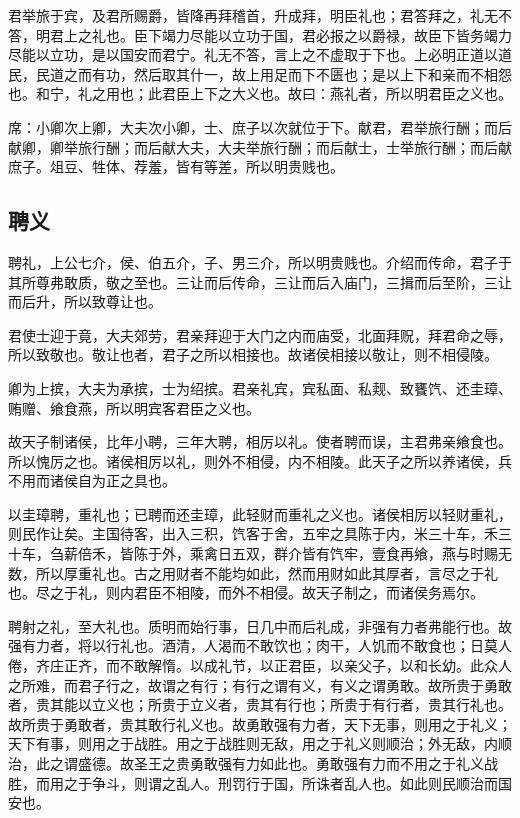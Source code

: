 \documentclass[]{article}
\begin{document}
君举旅于宾，及君所赐爵，皆降再拜稽首，升成拜，明臣礼也；君答拜之，礼无不答，明君上之礼也。臣下竭力尽能以立功于国，君必报之以爵禄，故臣下皆务竭力尽能以立功，是以国安而君宁。礼无不答，言上之不虚取于下也。上必明正道以道民，民道之而有功，然后取其什一，故上用足而下不匮也；是以上下和亲而不相怨也。和宁，礼之用也；此君臣上下之大义也。故曰：燕礼者，所以明君臣之义也。

席：小卿次上卿，大夫次小卿，士、庶子以次就位于下。献君，君举旅行酬；而后献卿，卿举旅行酬；而后献大夫，大夫举旅行酬；而后献士，士举旅行酬；而后献庶子。俎豆、牲体、荐羞，皆有等差，所以明贵贱也。

\hypertarget{header-n956}{%
\subsection{聘义}\label{header-n956}}

聘礼，上公七介，侯、伯五介，子、男三介，所以明贵贱也。介绍而传命，君子于其所尊弗敢质，敬之至也。三让而后传命，三让而后入庙门，三揖而后至阶，三让而后升，所以致尊让也。

君使士迎于竟，大夫郊劳，君亲拜迎于大门之内而庙受，北面拜贶，拜君命之辱，所以致敬也。敬让也者，君子之所以相接也。故诸侯相接以敬让，则不相侵陵。

卿为上摈，大夫为承摈，士为绍摈。君亲礼宾，宾私面、私觌、致饔饩、还圭璋、贿赠、飨食燕，所以明宾客君臣之义也。

故天子制诸侯，比年小聘，三年大聘，相厉以礼。使者聘而误，主君弗亲飨食也。所以愧厉之也。诸侯相厉以礼，则外不相侵，内不相陵。此天子之所以养诸侯，兵不用而诸侯自为正之具也。

以圭璋聘，重礼也；已聘而还圭璋，此轻财而重礼之义也。诸侯相厉以轻财重礼，则民作让矣。主国待客，出入三积，饩客于舍，五牢之具陈于内，米三十车，禾三十车，刍薪倍禾，皆陈于外，乘禽日五双，群介皆有饩牢，壹食再飨，燕与时赐无数，所以厚重礼也。古之用财者不能均如此，然而用财如此其厚者，言尽之于礼也。尽之于礼，则内君臣不相陵，而外不相侵。故天子制之，而诸侯务焉尔。

聘射之礼，至大礼也。质明而始行事，日几中而后礼成，非强有力者弗能行也。故强有力者，将以行礼也。酒清，人渴而不敢饮也；肉干，人饥而不敢食也；日莫人倦，齐庄正齐，而不敢解惰。以成礼节，以正君臣，以亲父子，以和长幼。此众人之所难，而君子行之，故谓之有行；有行之谓有义，有义之谓勇敢。故所贵于勇敢者，贵其能以立义也；所贵于立义者，贵其有行也；所贵于有行者，贵其行礼也。故所贵于勇敢者，贵其敢行礼义也。故勇敢强有力者，天下无事，则用之于礼义；天下有事，则用之于战胜。用之于战胜则无敌，用之于礼义则顺治；外无敌，内顺治，此之谓盛德。故圣王之贵勇敢强有力如此也。勇敢强有力而不用之于礼义战胜，而用之于争斗，则谓之乱人。刑罚行于国，所诛者乱人也。如此则民顺治而国安也。
\end{document}
